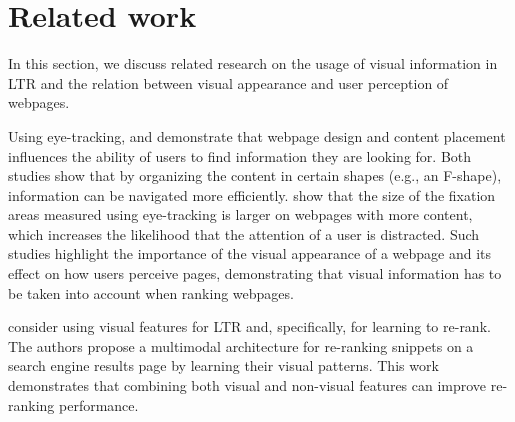 
\section{Related work}
\label{sec:relatedwork}


In this section, we discuss related research on the usage of visual information in \ac{LTR} and the relation between visual appearance and user perception of webpages.


Using eye-tracking, \citet{nielsen2006f} and \citet{pernice2017f} demonstrate that webpage design and content placement influences the ability of users to find information they are looking for. 
Both studies show that by organizing the content in certain shapes (e.g., an F-shape), information can be navigated more efficiently.
\citet{wang2014eye} show that the size of the fixation areas measured using eye-tracking is larger on webpages with more content, which increases the likelihood that the attention of a user is distracted.
Such studies highlight the importance of the visual appearance of a webpage and its effect on how users perceive pages, demonstrating that visual information has to be taken into account when ranking webpages.

\citet{zhang2018relevance} consider using visual features for \ac{LTR} and, specifically, for learning to re-rank.
The authors propose a multimodal architecture for re-ranking snippets on a search engine results page by learning their visual patterns.
This work demonstrates that combining both visual and non-visual features can improve re-ranking performance.

